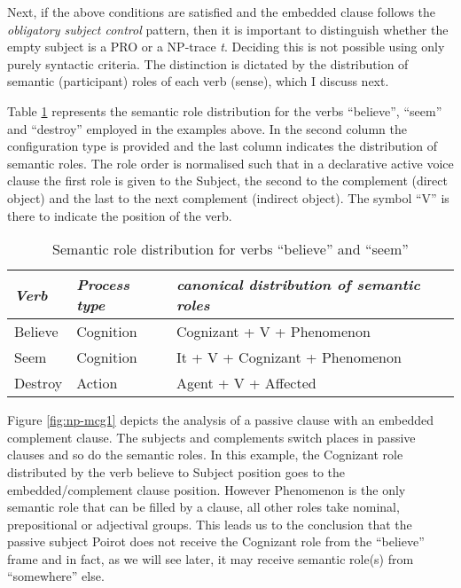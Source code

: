     Next, if the above conditions are satisfied and the embedded clause follows the \textit{obligatory subject control} pattern, then it is important to distinguish whether the empty subject is a PRO or a NP-trace \textit{t}. Deciding this is not possible using only purely syntactic criteria. The distinction is dictated by the distribution of semantic (participant) roles of each verb (sense), which I discuss next.

    Table \ref{tab:srl-for-example} represents the semantic role distribution for the verbs ``believe'', ``seem'' and ``destroy'' employed in the examples above. In the second column the configuration type is provided and the last column indicates the distribution of semantic roles. The role order is normalised such that in a declarative active voice clause the first role is given to the Subject, the second to the complement (direct object) and the last to the next complement (indirect object). The symbol ``V'' is there to indicate the position of the verb. 

    \begin{table}[!ht]
        \centering
        \begin{tabular}{|l|l|l|}
            \hline
            \textit{Verb} & \textit{Process type} & \textit{canonical distribution of semantic roles} \\ \hline
            Believe & Cognition & Cognizant + V + Phenomenon \\ \hline
            Seem & Cognition & It + V + Cognizant + Phenomenon \\ \hline
            Destroy & Action & Agent + V + Affected \\ \hline
        \end{tabular}
        \caption{Semantic role distribution for verbs ``believe'' and ``seem''}
        \label{tab:srl-for-example}
    \end{table}

    Figure \ref{fig:np-mcg1} depicts the analysis of a passive clause with an embedded complement clause. The subjects and complements switch places in passive clauses and so do the semantic roles. In this example, the Cognizant role distributed by the verb believe to Subject position goes to the embedded/complement clause position. However Phenomenon is the only semantic role that can be filled by a clause, all other roles take nominal, prepositional or adjectival groups. This leads us to the conclusion that the passive subject Poirot does not receive the Cognizant role from the ``believe'' frame and in fact, as we will see later, it may receive  semantic role(s) from ``somewhere'' else. 

